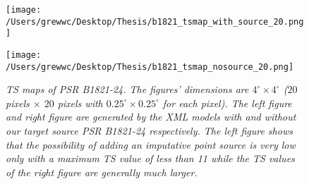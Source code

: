 \documentclass[12pt]{report}
\newcommand{\mycaption}[1]{\caption{\textit{\footnotesize #1}}}
\begin{document}
            \begin{figure}[!ht]
              \begin{center}
              \begin{minipage}{0.46\textwidth}
                \begin{center} 
                  \texttt{[image: /Users/grewwc/Desktop/Thesis/b1821\_tsmap\_with\_source\_20.png]}
                \end{center}
              \end{minipage}
              \begin{minipage}{0.45\textwidth}
                \begin{center}
                  \texttt{[image: /Users/grewwc/Desktop/Thesis/b1821\_tsmap\_nosource\_20.png]}
                \end{center}
              \end{minipage}
            \end{center}
            \mycaption{TS maps of PSR B1821-24. The figures' dimensions are $4^{\circ} \times4^{\circ}$ 
            ($20$ pixels $\times$ $20$ pixels with $0.25^{\circ} \times 0.25^{\circ}$ for each pixel). 
            The \textsf{left} figure and \textsf{right} figure are generated by the XML models with and without our 
            target source PSR B1821-24 respectively. The \textsf{left} figure shows that the possibility 
            of adding an imputative point source is very low only with a maximum TS value of 
            less than 11 while the TS values of the \textsf{right} figure are generally much larger.}
            \label{fig: b1821_tsmap_comparison_20}
            \end{figure}
            \vspace{1cm}
\end{document}
